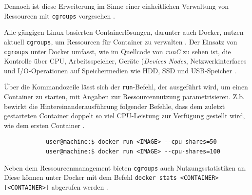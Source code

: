 \documentclass[../main.tex]{subfiles}
\begin{document}
		Dennoch ist diese Erweiterung im Sinne einer einheitlichen Verwaltung von Ressourcen mit \texttt{\acrshort{cgroups}} vorgesehen \cite[S.16+19]{dockerSec2}.

		Alle gängigen Linux-basierten Containerlösungen, darunter auch Docker, nutzen aktuell \texttt{\acrshort{cgroups}}, um Ressourcen für Container zu verwalten \cite[S.16]{dockerSec2}. Der Einsatz von \texttt{\acrshort{cgroups}} unter Docker umfasst, wie im Quellcode von \emph{runC} zu sehen ist, die Kontrolle über \acrshort{CPU}, Arbeitsspeicher, Geräte (\emph{Devices Nodes}, Netzwerkinterfaces und \acrshort{I/O}-Operationen auf Speichermedien wie \acrshort{HDD}, \acrshort{SSD} und \acrshort{USB}-Speicher \cite{cgroupsRedhat}\cite{githubRunCCgroups}.

		Über die Kommandozeile lässt sich der \texttt{run}-Befehl, der ausgeführt wird, um einen Container zu starten, mit Angaben zur Ressourcennutzung parametrisieren. Z.b. bewirkt die Hintereinanderausführung folgender Befehle, dass dem zuletzt gestarteten Container doppelt so viel CPU-Leistung zur Verfügung gestellt wird, wie dem ersten Container \cite{dockerRun}.

		\begin{lstlisting}
			user@machine:$ docker run <IMAGE> --cpu-shares=50
			user@machine:$ docker run <IMAGE> --cpu-shares=100
		\end{lstlisting}

		Neben dem Ressourcenmanagement bieten \texttt{\acrshort{cgroups}} auch Nutzungsstatistiken an. Diese können unter Docker mit dem Befehl \texttt{docker stats <CONTAINER> [<CONTAINER>]} abgerufen werden \cite{dockerMetrics}.



\end{document}
